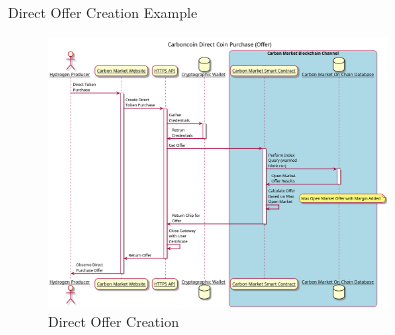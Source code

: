 \begin{frame}{Direct Offer Creation Example}
    \begin{figure}
        \caption{Direct Offer Creation}
        \centering
        \includegraphics[height=0.7\textheight, width=0.8\textwidth]
        {figures/directOffer.png}
    \end{figure}
\end{frame}
